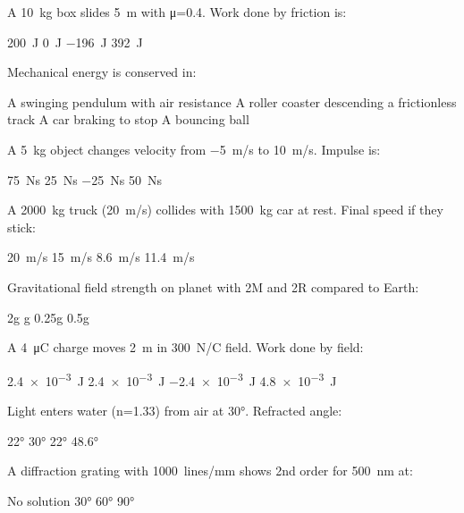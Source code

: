 \documentclass[addpoints]{exam}
\begin{document}
\begin{questions}
\question[1] A \SI{10}{kg} box slides \SI{5}{m} with μ=0.4. Work done by friction is:
\begin{choices}
    \choice \SI{200}{J}
    \choice \SI{0}{J}
    \correctchoice \SI{-196}{J}
    \choice \SI{392}{J}
\end{choices}

\question[1] Mechanical energy is conserved in:
\begin{choices}
    \choice A swinging pendulum with air resistance
    \correctchoice A roller coaster descending a frictionless track
    \choice A car braking to stop
    \choice A bouncing ball
\end{choices}

\question[1] A \SI{5}{kg} object changes velocity from \SI{-5}{m/s} to \SI{10}{m/s}. Impulse is:
\begin{choices}
    \correctchoice \SI{75}{Ns}
    \choice \SI{25}{Ns}
    \choice \SI{-25}{Ns}
    \choice \SI{50}{Ns}
\end{choices}

\question[1] A \SI{2000}{kg} truck (\SI{20}{m/s}) collides with \SI{1500}{kg} car at rest. Final speed if they stick:
\begin{choices}
    \choice \SI{20}{m/s}
    \choice \SI{15}{m/s}
    \choice \SI{8.6}{m/s}
    \correctchoice \SI{11.4}{m/s}
\end{choices}

\question[1] Gravitational field strength on planet with 2M and 2R compared to Earth:
\begin{choices}
    \choice 2g
    \choice g
    \choice 0.25g
    \correctchoice 0.5g
\end{choices}

\question[1] A \SI{4}{\micro C} charge moves \SI{2}{m} in \SI{300}{N/C} field. Work done by field:
\begin{choices}
    \choice \SI{2.4e-3}{J}
    \correctchoice \SI{2.4e-3}{J}
    \choice \SI{-2.4e-3}{J}
    \choice \SI{4.8e-3}{J}
\end{choices}

\question[1] Light enters water (n=1.33) from air at \ang{30}. Refracted angle:
\begin{choices}
    \choice \ang{22}
    \choice \ang{30}
    \correctchoice \ang{22}
    \choice \ang{48.6}
\end{choices}

\question[1] A diffraction grating with \SI{1000}{lines/mm} shows 2nd order for \SI{500}{nm} at:
\begin{choices}
    \correctchoice No solution
    \choice \ang{30}
    \choice \ang{60}
    \choice \ang{90}
\end{choices}


\end{questions}
\end{document}
